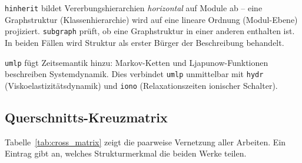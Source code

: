 ﻿\documentclass[a4paper,12pt]{scrreprt}
\theoremstyle{definition}
\begin{document}
\texttt{hinherit} bildet Vererbungshierarchien \emph{horizontal} auf Module
ab -- eine Graphstruktur (Klassenhierarchie) wird auf eine lineare Ordnung
(Modul-Ebene) projiziert. \texttt{subgraph} prüft, ob eine Graphstruktur
in einer anderen enthalten ist. In beiden Fällen wird Struktur als erster
Bürger der Beschreibung behandelt.

\texttt{umlp} fügt Zeitsemantik hinzu: Markov-Ketten und Ljapunow-Funktionen
beschreiben Systemdynamik. Dies verbindet \texttt{umlp} unmittelbar mit
\texttt{hydr} (Viskoelastizitätsdynamik) und \texttt{iono} (Relaxationszeiten
ionischer Schalter).

\subsection{Querschnitts-Kreuzmatrix}

Tabelle~\ref{tab:cross_matrix} zeigt die paarweise Vernetzung aller Arbeiten.
Ein Eintrag gibt an, welches Strukturmerkmal die beiden Werke teilen.
\end{document}
